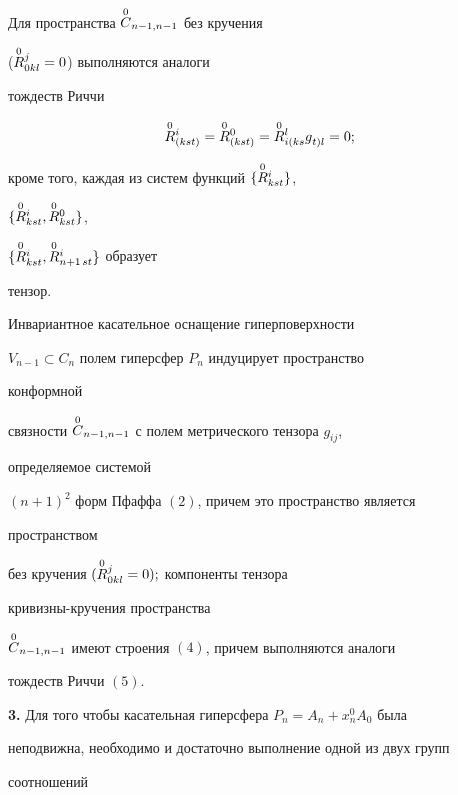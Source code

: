  


Для пространства $\overset{0}{C}{}_{n-1,n-1}$ без кручения 


($\overset{0}{R}{}^j_{0kl}=0$) выполняются аналоги 


тождеств Риччи 


\begin{equation} 


\up{0}{R}^i_{(kst)}=\up{0}{R}^0_{(kst)}= 


\up{0}{R}{}^l_{i(ks} g{}^{\phantom{l}}_{t)l} =0; 


\end{equation} 


кроме того, каждая из систем функций $\{\overset{0}{R}{}^i_{kst}\}$, 


$\{\overset{0}{R}{}^i_{kst},\overset{0}{R}{}^0_{kst}\}$, 


$\{\overset{0}{R}{}^i_{kst},\overset{0}{R}{}^i_{n+1\,st}\}$ образует 


тензор. 


 


 


\begin{thm} 


Инвариантное касательное оснащение гиперповерхности 


$V_{n-1}\subset C_n$ полем гиперсфер $P_n$ индуцирует пространство 


конформной  


связности $\overset{0}{C}{}_{n-1,n-1}$ с полем метрического тензора $g_{ij}$, 


определяемое системой 


$(n+1)^2$ форм Пфаффа $(2)$, причем это пространство является 


пространством 


без кручения $(\overset{0}{R}{}^j_{0kl}=0);$ компоненты тензора 


кривизны-кручения пространства 


$\overset{0}{C}{}_{n-1,n-1}$ имеют строения $(4)$, причем выполняются аналоги 


тождеств Риччи $(5)$. 


\end{thm} 


 


{\bf 3.} Для того чтобы касательная гиперсфера $P_n=A_n+x^0_nA_0$ была 


неподвижна, необходимо и достаточно выполнение одной из двух групп 


соотношений 


